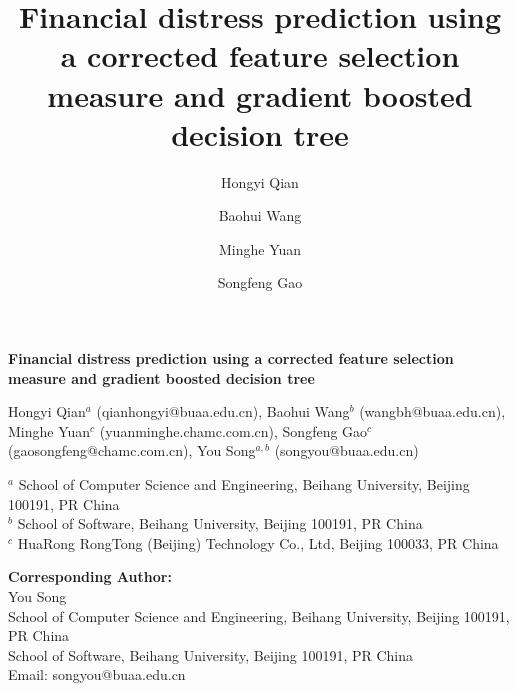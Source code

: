 \documentclass[review]{elsarticle}
\begin{document}
\begin{frontmatter}


\begin{titlepage}
\begin{center}
\vspace*{1cm}

\textbf{ \large Financial distress prediction using a corrected feature selection measure and gradient boosted decision tree}

\vspace{1.5cm}

Hongyi Qian$^{a}$ (qianhongyi@buaa.edu.cn), Baohui Wang$^{b}$ (wangbh@buaa.edu.cn), Minghe Yuan$^{c}$ (yuanminghe.chamc.com.cn), Songfeng Gao$^{c}$ (gaosongfeng@chamc.com.cn), You Song$^{a,b}$ (songyou@buaa.edu.cn) \\

\hspace{10pt}

\begin{flushleft}
\small
$^a$ School of Computer Science and Engineering, Beihang University, Beijing 100191, PR China \\
$^b$ School of Software, Beihang University, Beijing 100191, PR China \\
$^c$ HuaRong RongTong (Beijing) Technology Co., Ltd, Beijing 100033, PR China

\vspace{1cm}
\textbf{Corresponding Author:} \\
You Song \\
School of Computer Science and Engineering, Beihang University, Beijing 100191, PR China \\
School of Software, Beihang University, Beijing 100191, PR China \\
Email: songyou@buaa.edu.cn


\end{flushleft}
\end{center}
\end{titlepage}

\title{Financial distress prediction using a corrected feature selection measure and gradient boosted decision tree}

\author[label1]{Hongyi Qian}

\author[label2]{Baohui Wang}

\author[label3]{Minghe Yuan}

\author[label3]{Songfeng Gao}


\end{frontmatter}
\end{document}
